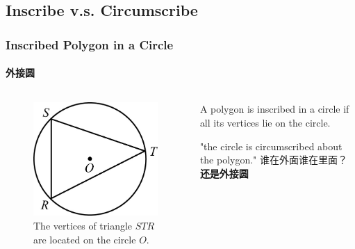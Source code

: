 \documentclass[
	11pt, %
]{beamer}
\begin{document}

\subsection{Inscribe v.s. Circumscribe}


\begin{frame}
\frametitle{Inscribed Polygon in a Circle}
\framesubtitle{外接圆}

\begin{columns}[t] 
		\begin{column}{0.4\textwidth} %
			\begin{figure}
				\includegraphics[width=\linewidth]{Inscribe.jpg}
				\caption{The vertices of triangle $STR$ are located on the circle $O$.}
			\end{figure}
		\end{column}
		\begin{column}{0.6\textwidth} %
		\begin{definition}
			A polygon is inscribed in a circle if all its vertices lie on the circle.
		\end{definition}
		\pause "the circle is circumscribed about the polygon." 谁在外面谁在里面？ \pause \alert{\textbf{还是外接圆}}
		\end{column}
	\end{columns}
\end{frame}
\end{document}
